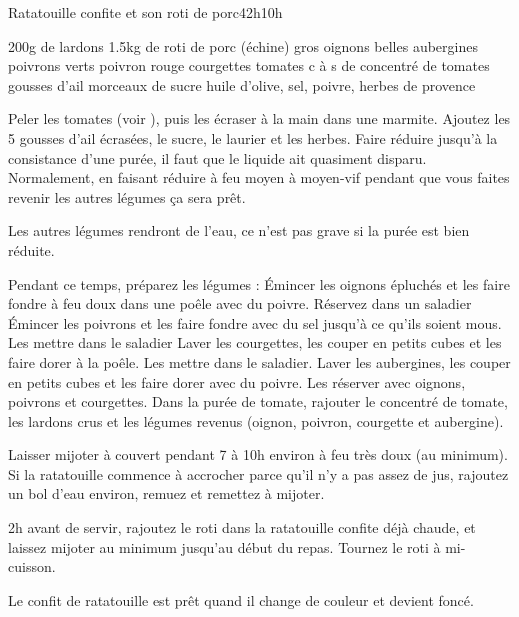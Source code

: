 \begin{recette}{Ratatouille confite et son roti de porc}{4}{2h}{10h}
\begin{ingredients}
\ingredient 200g de lardons
\ingredient 1.5kg de roti de porc (échine)
 gros oignons
 belles aubergines
 poivrons verts
 poivron rouge
 courgettes
 tomates
 c à s de concentré de tomates
 gousses d'ail
 morceaux de sucre
\ingredient huile d'olive, sel, poivre, herbes de provence
\end{ingredients}

\begin{preparation}
\etape Peler les tomates (voir ), puis les écraser à la main dans une marmite. Ajoutez les 5 gousses d'ail écrasées, le sucre, le laurier et les herbes. 
\etape Faire réduire jusqu'à la consistance d'une purée, il faut que le liquide ait quasiment disparu. Normalement, en faisant réduire à feu moyen à moyen-vif pendant que vous faites revenir les autres légumes ça sera prêt. 
\begin{remarque}
Les autres légumes rendront de l'eau, ce n'est pas grave si la purée est bien réduite.
\end{remarque}
\etape Pendant ce temps, préparez les légumes : 
\etape Émincer les oignons épluchés et les faire fondre à feu doux dans une poêle avec du poivre. Réservez dans un saladier
\etape Émincer les poivrons et les faire fondre avec du sel jusqu'à ce qu'ils soient mous. Les mettre dans le saladier
\etape Laver les courgettes, les couper en petits cubes et les faire dorer à la poêle. Les mettre dans le saladier.
\etape Laver les aubergines, les couper en petits cubes et les faire dorer avec du poivre. Les réserver avec oignons, poivrons et courgettes.
\etape Dans la purée de tomate, rajouter le concentré de tomate, les lardons crus et les légumes revenus (oignon, poivron, courgette et aubergine).
\end{preparation}

\begin{cuisson}
Laisser mijoter à couvert pendant 7 à 10h environ à feu très doux (au minimum). Si la ratatouille commence à accrocher parce 
qu'il n'y a pas assez de jus, rajoutez un bol d'eau environ, remuez et remettez à mijoter.

2h avant de servir, rajoutez le roti dans la ratatouille confite déjà chaude, et laissez mijoter au minimum jusqu'au début du 
repas. Tournez le roti à mi-cuisson.

Le confit de ratatouille est prêt quand il change de couleur et devient foncé. 

\end{cuisson}
\end{recette}

